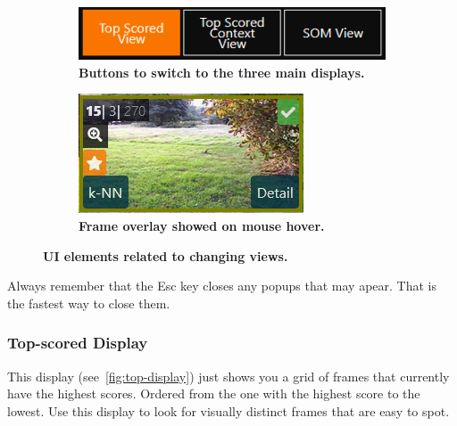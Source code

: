 \begin{figure}[h]
	\centering
  \begin{subfigure}[b]{0.6\textwidth}
      \centering
      \includegraphics[width=\textwidth]{img/view-buttons.png}
      \caption{\textbf{Buttons to switch to the three main displays.}}
      \label{fig:display-buttons}
  \end{subfigure}
  \hfill
  \begin{subfigure}[b]{0.35\textwidth}
      \centering
      \includegraphics[width=\textwidth]{img/frame-overlay.png}
      \caption{\textbf{Frame overlay showed on mouse hover.}}
      \label{fig:frame-overlay}
  \end{subfigure}
	
  \caption{\textbf{UI elements related to changing views.}}
	
\end{figure}

Always remember that the Esc key closes any popups that may apear. That is the fastest way to close them.

\pagebreak
\subsubsection{Top-scored Display}
This display (see~\cref{fig:top-display}) just shows you a grid of frames that currently have the highest scores. Ordered from the one with the highest score to the lowest. Use this display to look for visually distinct frames that are easy to spot.

